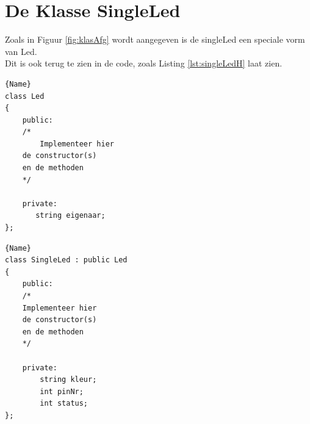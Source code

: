 \newpage
\section{De Klasse SingleLed} \label{sec:singleLed}

Zoals in Figuur \ref{fig:klasAfg} wordt aangegeven is de singleLed een speciale vorm van Led. \\Dit is ook terug te zien in de code, zoals Listing \ref{lst:singleLedH} laat zien.

\noindent\begin{minipage}{.45\textwidth}
\begin{lstlisting}[caption=LED declaratie file(.h),frame=tlrb,label={lst:ledBaseH}]{Name}
class Led
{
	public:
	/*
		Implementeer hier 
	de constructor(s) 
	en de methoden
	*/
	
	private:
       string eigenaar;
};
\end{lstlisting}
\end{minipage}\hfill
\begin{minipage}{.45\textwidth}
\begin{lstlisting}[caption=SingleLed declaratie file(.h),frame=tlrb,label={lst:singleLedH}]{Name}
class SingleLed : public Led
{
	public:
	/*
	Implementeer hier 
	de constructor(s) 
	en de methoden
	*/

	private:
        string kleur;
	    int pinNr;
	    int status;
};
\end{lstlisting}
\end{minipage}
